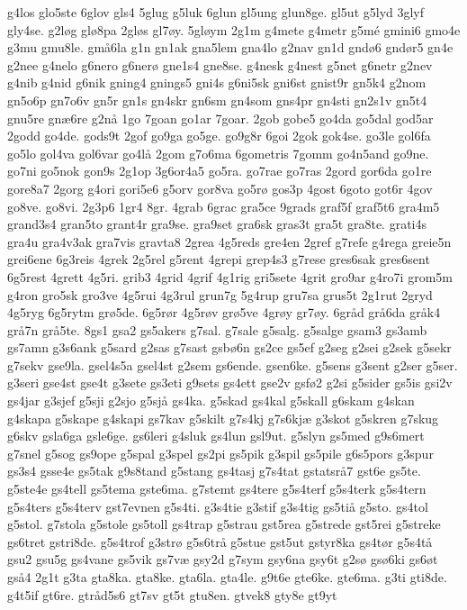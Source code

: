 {g4los
glo5ste
6glov
gls4
5glug
g5luk
6glun
gl5ung
glun8ge.
gl5ut
g5lyd
3glyf
gly4se.
g2løg
glø8pa
2gløs
gl7øy.
5gløym
2g1m
g4mete
g4metr
g5mé
gmini6
gmo4e
g3mu
gmu8le.
gmå6la
g1n
gn1ak
gna5lem
gna4lo
g2nav
gn1d
gndø6
gndør5
gn4e
g2nee
g4nelo
g6nero
g6nerø
gne1s4
gne8se.
g4nesk
g4nest
g5net
g6netr
g2nev
g4nib
g4nid
g6nik
gning4
gnings5
gni4s
g6ni5sk
gni6st
gnist9r
gn5k4
g2nom
gn5o6p
gn7o6v
gn5r
gn1s
gn4skr
gn6sm
gn4som
gns4pr
gn4sti
gn2s1v
gn5t4
gnu5re
gnæ6re
g2nå
1go
7goan
go1ar
7goar.
2gob
gobe5
go4da
go5dal
god5ar
2godd
go4de.
gods9t
2gof
go9ga
go5ge.
go9g8r
6goi
2gok
gok4se.
go3le
gol6fa
go5lo
gol4va
gol6var
go4lå
2gom
g7o6ma
6gometris
7gomm
go4n5and
go9ne.
go7ni
go5nok
gon9s
2g1op
3g6or4a5
go5ra.
go7rae
go7ras
2gord
gor6da
go1re
gore8a7
2gorg
g4ori
gori5e6
g5orv
gor8va
go5rø
gos3p
4gost
6goto
got6r
4gov
go8ve.
go8vi.
2g3p6
1gr4
8gr.
4grab
6grac
gra5ce
9grads
graf5f
graf5t6
gra4m5
grand3s4
gran5to
grant4r
gra9se.
gra9set
gra6sk
gras3t
gra5t
gra8te.
grati4s
gra4u
gra4v3ak
gra7vis
gravta8
2grea
4g5reds
gre4en
2gref
g7refe
g4rega
greie5n
grei6ene
6g3reis
4grek
2g5rel
g5rent
4grepi
grep4s3
g7rese
gres6sak
gres6sent
6g5rest
4grett
4g5ri.
grib3
4grid
4grif
4g1rig
gri5sete
4grit
gro9ar
g4ro7i
grom5m
g4ron
gro5sk
gro3ve
4g5rui
4g3rul
grun7g
5g4rup
gru7sa
grus5t
2g1rut
2gryd
4g5ryg
6g5rytm
grø5de.
6g5rør
4g5røv
grø5ve
4grøy
gr7øy.
6gråd
grå6da
gråk4
grå7n
grå5te.
8gs1
gsa2
gs5akers
g7sal.
g7sale
g5salg.
g5salge
gsam3
gs3amb
gs7amn
g3s6ank
g5sard
g2sas
g7sast
gsbø6n
gs2ce
gs5ef
g2seg
g2sei
g2sek
g5sekr
g7sekv
gse9la.
gsel4s5a
gsel4st
g2sem
gs6ende.
gsen6ke.
g5sens
g3sent
g2ser
g5ser.
g3seri
gse4st
gse4t
g3sete
gs3eti
g9sets
gs4ett
gse2v
gsfø2
g2si
g5sider
gs5is
gsi2v
gs4jar
g3sjef
g5sji
g2sjo
g5sjå
gs4ka.
g5skad
gs4kal
g5skall
g6skam
g4skan
g4skapa
g5skape
g4skapi
gs7kav
g5skilt
g7s4kj
g7s6kjæ
g3skot
g5skren
g7skug
g6skv
gsla6ga
gsle6ge.
gs6leri
g4sluk
gs4lun
gsl9ut.
g5slyn
gs5med
g9s6mert
g7snel
g5sog
gs9ope
g5spal
g3spel
gs2pi
gs5pik
g3spil
gs5pile
g6s5pors
g3spur
gs3s4
gsse4e
gs5tak
g9s8tand
g5stang
gs4tasj
g7s4tat
gstatsrå7
gst6e
gs5te.
g5ste4e
gs4tell
gs5tema
gste6ma.
g7stemt
gs4tere
g5s4terf
g5s4terk
g5s4tern
g5s4ters
g5s4terv
gst7evnen
g5s4ti.
g3s4tie
g3stif
g3s4tig
gs5tiå
g5sto.
gs4tol
g5stol.
g7stola
g5stole
gs5toll
gs4trap
g5strau
gst5rea
g5strede
gst5rei
g5streke
gs6tret
gstri8de.
g5s4trof
g3strø
g5s6trå
g5stue
gst5ut
gstyr8ka
gs4tør
g5s4tå
gsu2
gsu5g
gs4vane
gs5vik
gs7væ
gsy2d
g7sym
gsy6na
gsy6t
g2sø
gsø6ki
gs6øt
gså4
2g1t
g3ta
gta8ka.
gta8ke.
gta6la.
gta4le.
g9t6e
gte6ke.
gte6ma.
g3ti
gti8de.
g4t5if
gt6re.
gtråd5s6
gt7sv
gt5t
gtu8en.
gtvek8
gty8e
gt9yt
}
